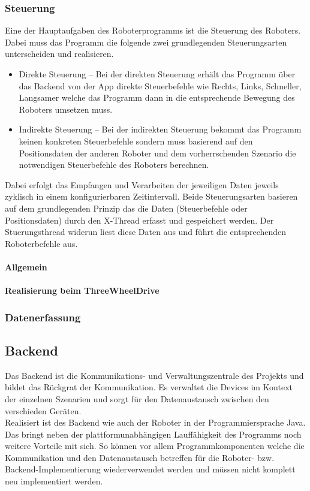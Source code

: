 \subsubsection{Steuerung}
Eine der Hauptaufgaben des Roboterprogramms ist die Steuerung des Roboters. Dabei muss das Programm die folgende zwei 
grundlegenden Steuerungsarten unterscheiden und realisieren.
\begin{itemize}
	\item{Direkte Steuerung} -- Bei der direkten Steuerung erhält das Programm über das Backend von der App direkte Steuerbefehle wie
	Rechts, Links, Schneller, Langsamer welche das Programm dann in die entsprechende Bewegung des Roboters umsetzen muss.
	\item{Indirekte Steuerung} -- Bei der indirekten Steuerung bekommt das Programm keinen konkreten Steuerbefehle sondern muss basierend
	auf den Positionsdaten der anderen Roboter und dem vorherrschenden Szenario die notwendigen Steuerbefehle des Roboters berechnen.
\end{itemize}
Dabei erfolgt das Empfangen und Verarbeiten der jeweiligen Daten jeweils zyklisch in einem konfigurierbaren Zeitintervall. Beide Steuerungsarten
basieren auf dem grundlegenden Prinzip das die Daten (Steuerbefehle oder Positionsdaten) durch den X-Thread erfasst und gespeichert werden.
Der Stuerungsthread widerun liest diese Daten aus und führt die entsprechenden Roboterbefehle aus.
\paragraph{Allgemein}
\paragraph{Realisierung beim ThreeWheelDrive}
\subsubsection{Datenerfassung}
\subsection{Backend}
Das Backend ist die Kommunikations- und Verwaltungszentrale des Projekts und bildet das Rückgrat der Kommunikation. Es verwaltet die 
Devices im Kontext der einzelnen Szenarien und sorgt für den Datenaustausch zwischen den verschieden Geräten. \\
Realisiert ist des Backend wie auch der Roboter in der Programmiersprache Java. Das bringt neben der plattformunabhängigen 
Lauffähigkeit des Programms noch weitere Vorteile mit sich. So können vor allem Programmkomponenten welche die Kommunikation und
den Datenaustausch betreffen für die Roboter- bzw. Backend-Implementierung wiederverwendet werden und müssen nicht komplett neu
implementiert werden.
